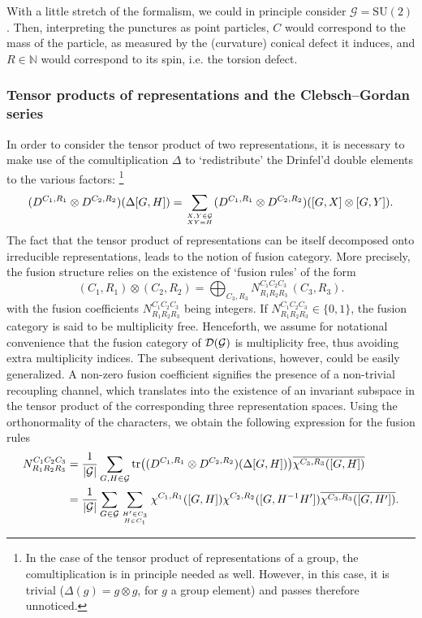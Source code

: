 \documentclass[nofootinbib,superscriptaddress,eqsecnum,tightenlines,11pt]{revtex4-1}
\def\SU{\text{SU}}
\def\mG{\mathcal{G}}
\def\be{\begin{equation}}
\def\ee{\end{equation}}
\begin{document}
With a little stretch of the formalism, we could in principle consider $\mG=\SU(2)$.
Then, interpreting the punctures as point particles, $C$ would correspond to the mass of the particle, as measured by the (curvature) conical defect it induces, and $R\in\mathbb N$ would correspond to its spin, i.e. the torsion defect.


\subsubsection{Tensor products of representations and the Clebsch--Gordan series\label{sec_CG}}


In order to consider the tensor product of two representations, it is necessary to make use of the comultiplication $\Delta$ to `redistribute' the Drinfel'd double elements to the various factors:%
\footnote{In the case of the tensor product of representations of a group, the comultiplication is in principle needed as well. However, in this case, it is trivial ($\Delta(g)=g\otimes g$, for $g$ a group element) and passes therefore unnoticed.}
\be
	(D^{C_1,R_1} \otimes D^{C_2,R_2})(\Delta[G,H]) = \sum_{X,Y \in \mathcal{G} \atop XY=H}(D^{C_1,R_1} \otimes D^{C_2,R_2})([G,X]\otimes [G,Y]).
\ee
The fact that the tensor product of representations can be itself decomposed onto irreducible representations, leads to the notion of fusion category.
More precisely, the fusion structure relies on the existence of `fusion rules' of the form
\be
 (C_1,R_1) \otimes (C_2,R_2) = \bigoplus_{C_3,R_3}N^{C_1C_2C_3}_{R_1R_2R_3} \, (C_3,R_3).
\ee 
 with the fusion coefficients $N^{C_1C_2C_3}_{R_1R_2R_3}$ being integers.
If $N^{C_1C_2C_3}_{R_1R_2R_3} \in \{0,1\}$, the fusion category is said to be multiplicity free.
Henceforth, we assume { for notational convenience} that the fusion category of ${\cal D}(\mG)$ is multiplicity free,{ thus avoiding extra multiplicity indices. The subsequent derivations, however, could be easily generalized}. 
A non-zero fusion coefficient signifies the presence of a non-trivial recoupling channel, which translates into the existence of an invariant subspace in the tensor product of the corresponding three representation spaces. 
Using the orthonormality of the characters, we obtain the following expression for the fusion rules \cite{Verlinde}
\begin{align}
	N^{C_1C_2C_3}_{R_1R_2R_3} &= \frac{1}{|\mathcal{G}|}\sum_{G,H \in \mathcal{G}}\text{tr}\big((D^{C_1,R_1} \otimes D^{C_2,R_2})(\Delta[G,H]) \big)
					\overline{\chi^{C_3,R_3}([G,H])} \\
	&=  \frac{1}{|\mathcal{G}|}\sum_{G \in \mathcal{G}}\sum_{H' \in C_3 \atop H \in C_1}\chi^{C_1,R_1}([G,H]) \chi^{C_2,R_2}([G,H^{-1}H'])
					\overline{\chi^{C_3,R_3}([G,H'])} .\label{fusion}
\end{align}
\end{document}
